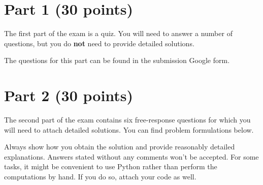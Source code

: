 \documentclass{exam}
\begin{document}
\newpage

\newpage

\section*{Part 1 (30 points)}

The first part of the exam is a quiz. You will need to answer a number of questions, but you do \textbf{not} need to provide detailed solutions.

\vspace{0.25cm}
\noindent
The questions for this part can be found in the submission Google form.

\section*{Part 2 (30 points)}

The second part of the exam contains six free-response questions for which you will need to attach detailed solutions. You can find problem formulations below.

\vspace{0.25cm}
\noindent
Always show how you obtain the solution and provide reasonably detailed explanations. Answers stated without any comments won't be accepted. For some tasks, it might be convenient to use Python rather than perform the computations by hand. If you do so, attach your code as well.
\end{document}
